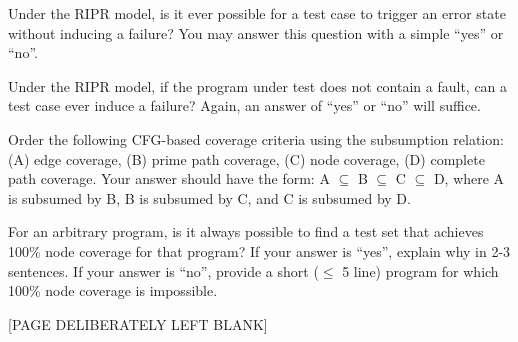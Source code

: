 \documentclass[addpoints, answers]{exam}
\begin{document}
\begin{questions}

  \newpage



\question[1] %
  Under the RIPR model, is it ever possible for a test case to trigger
  an error state without inducing a failure? You may answer this
  question with a simple ``yes'' or ``no''. %


\question[1] %
  Under the RIPR model, if the program under test does not contain a
  fault, can a test case ever induce a failure? Again, an answer of
  ``yes'' or ``no'' will suffice.


\question[3] %
  Order the following CFG-based coverage criteria using the
  subsumption relation: (A) edge coverage, (B) prime path coverage,
  (C) node coverage, (D) complete path coverage. Your answer should
  have the form: A $\subseteq$ B $\subseteq$ C $\subseteq$ D, where A
  is subsumed by B, B is subsumed by C, and C is subsumed by D.


\question[2] %
  For an arbitrary program, is it always possible to find a test set
  that achieves 100\% node coverage for that program? If your answer is
  ``yes'', explain why in 2-3 sentences. If your answer is ``no'',
  provide a short ($\leq$ 5 line) program for which 100\% node
  coverage is impossible.


\newpage
\begin{center}
  [PAGE DELIBERATELY LEFT BLANK]
\end{center}
\newpage


\end{questions}
\end{document}

